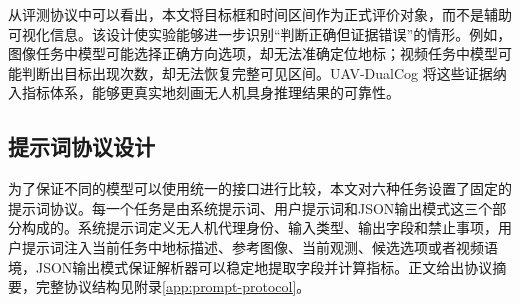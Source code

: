 从评测协议中可以看出，本文将目标框和时间区间作为正式评价对象，而不是辅助可视化信息。该设计使实验能够进一步识别“判断正确但证据错误”的情形。例如，图像任务中模型可能选择正确方向选项，却无法准确定位地标；视频任务中模型可能判断出目标出现次数，却无法恢复完整可见区间。UAV-DualCog 将这些证据纳入指标体系，能够更真实地刻画无人机具身推理结果的可靠性。

\subsection{提示词协议设计}

为了保证不同的模型可以使用统一的接口进行比较，本文对六种任务设置了固定的提示词协议。每一个任务是由系统提示词、用户提示词和JSON输出模式这三个部分构成的。系统提示词定义无人机代理身份、输入类型、输出字段和禁止事项，用户提示词注入当前任务中地标描述、参考图像、当前观测、候选选项或者视频语境，JSON输出模式保证解析器可以稳定地提取字段并计算指标。正文给出协议摘要，完整协议结构见附录\autoref{app:prompt-protocol}。

